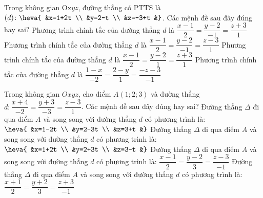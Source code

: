 \begin{ex}%
	Trong không gian $\mathrm{Ox} y z$, đường thẳng có PTTS là $(d)\colon \heva{	&x=1+2t \\
		&y=2-t \\
		&z=-3+t
		&}$. Các mệnh đề sau đây đúng hay sai?
	\choiceTF
	{\True Phương trình chính tắc của đường thẳng $d$ là $\dfrac{x-1}{2}=\dfrac{y-2}{-1}=\dfrac{z+3}{1}$}
	{Phương trình chính tắc của đường thẳng $d$ là $\dfrac{x-1}{2}=\dfrac{y-2}{-1}=\dfrac{z-3}{1}$}
	{Phương trình chính tắc của đường thẳng $d$ là $\dfrac{x-1}{2}=\dfrac{y-2}{1}=\dfrac{z+3}{1}$}
	{\True Phương trình chính tắc của đường thẳng $d$ là $\dfrac{1-x}{-2}=\dfrac{2-y}{1}=\dfrac{-z-3}{-1}$}
\end{ex}
\begin{ex}%
	Trong không gian $Oxyz$, cho điểm $A(1; 2; 3)$ và đường thẳng $d: \dfrac{x+4}{-2}=\dfrac{y+3}{-3}=\dfrac{z-3}{1}$. Các mệnh đề sau đây đúng hay sai?
	\choiceTF
	{\True Đường thẳng $\Delta$ đi qua điểm $A$ và song song với đường thẳng $d$ có phương trình là: $\heva{	&x=1-2t \\
			&y=2-3t \\
			&z=3+t
			&}$}
	{\True Đường thẳng $\Delta$ đi qua điểm $A$ và song song với đường thẳng $d$ có phương trình là: $\heva{	&x=1+2t \\
			&y=2+3t \\
			&z=3-t
			&}$}
	{\True Đường thẳng $\Delta$ đi qua điểm $A$ và song song với đường thẳng $d$ có phương trình là: $\dfrac{x-1}{2}=\dfrac{y-2}{3}=\dfrac{z-3}{-1}$}
	{Đường thẳng $\Delta$ đi qua điểm $A$ và song song với đường thẳng $d$ có phương trình là: $\dfrac{x+1}{2}=\dfrac{y+2}{3}=\dfrac{z+3}{-1}$}
\end{ex}

